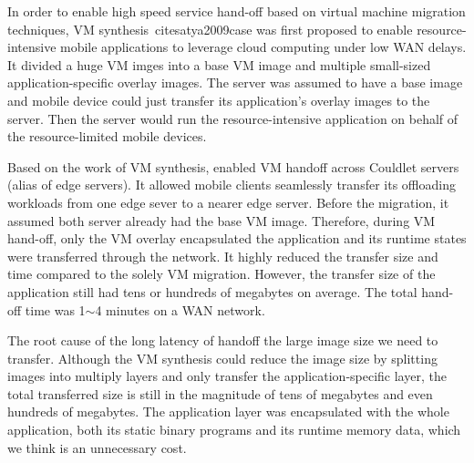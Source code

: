 
In order to enable high speed service hand-off based on virtual machine migration techniques, VM synthesis\ cite{satya2009case}  was first proposed to enable resource-intensive mobile applications to leverage cloud computing under low WAN delays. It divided a huge VM imges into a base VM image and multiple small-sized application-specific overlay images. The server was assumed to have a base image and mobile device could just transfer its application's overlay images to the server. Then the server would run the resource-intensive application on behalf of the resource-limited mobile devices. 



Based on the work of VM synthesis, \cite{ha2015vmhandoff} enabled VM handoff across Couldlet servers (alias of edge servers). It allowed mobile clients seamlessly transfer its offloading workloads from one edge sever to a nearer edge server. Before the migration, it assumed both server already had the base VM image. Therefore, during VM hand-off, only the VM overlay encapsulated the application and its runtime states were transferred through the network. It highly reduced the transfer size and time compared to the solely VM migration. However, the transfer size of the application still had tens or hundreds of megabytes on average. The total hand-off time was 1$\sim$4 minutes on a WAN network.



The root cause of the long latency of handoff the large image size we need to transfer. Although the VM synthesis could reduce the image size by splitting images into multiply layers and only transfer the application-specific layer, the total transferred size is still in the magnitude of tens of megabytes and even hundreds of megabytes. The application layer was encapsulated with the whole application, both its static binary programs and its runtime memory data, which we think is an unnecessary cost. 


